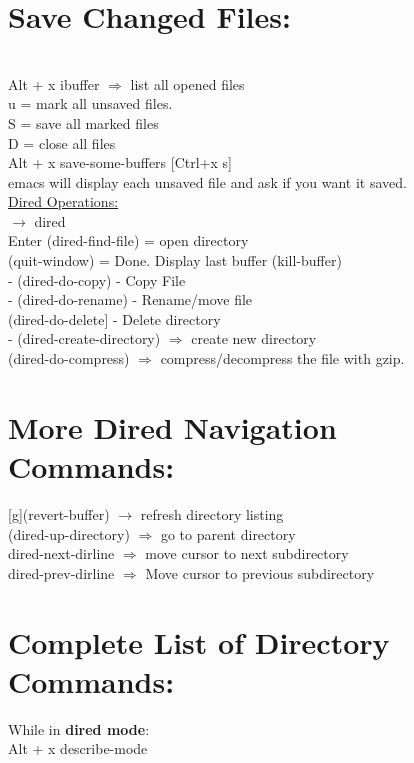 \documentclass{article}
\begin{document}
\section{Save Changed Files:}
\\
Alt + x ibuffer $\Rightarrow$ list all opened files
\\
\*u = mark all unsaved files.
\\
S = save all marked files
\\
D = close all files
\\
Alt + x save-some-buffers [Ctrl+x s]
\\
emacs will display each unsaved file and ask if you want it saved.
\\
\underline{Dired Operations:}
\\
$\rightarrow$ dired
\\
Enter (dired-find-file) = open directory
\\
[q](quit-window) = Done. Display last buffer (kill-buffer)
\\
[C] - (dired-do-copy) - Copy File
\\
[R] - (dired-do-rename) - Rename/move file
\\
[D](dired-do-delete] - Delete directory
\\
[t] - (dired-create-directory) $\Rightarrow$ create new directory
\\
[z] (dired-do-compress) $\Rightarrow$ compress/decompress the file with gzip.
\\
\section{More Dired Navigation Commands:}
[g](revert-buffer) $\rightarrow$ refresh directory listing
\\
[\^](dired-up-directory) $\Rightarrow$ go to parent directory
\\
[$>$] dired-next-dirline $\Rightarrow$ move cursor to next subdirectory
\\
[$<$] dired-prev-dirline $\Rightarrow$ Move cursor to previous subdirectory
\\
\section{Complete List of Directory Commands:}
While in \textbf{dired mode}:
\\
Alt + x describe-mode
\\
\end{document}
